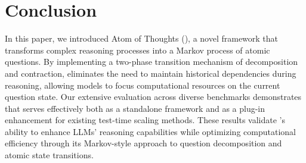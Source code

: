 \section{Conclusion}
In this paper, we introduced Atom of Thoughts (\our), a novel framework that transforms complex reasoning processes into a Markov process of atomic questions. By implementing a two-phase transition mechanism of decomposition and contraction, \our eliminates the need to maintain historical dependencies during reasoning, allowing models to focus computational resources on the current question state. Our extensive evaluation across diverse benchmarks demonstrates that \our serves effectively both as a standalone framework and as a plug-in enhancement for existing test-time scaling methods. These results validate \our's ability to enhance LLMs' reasoning capabilities while optimizing computational efficiency through its Markov-style approach to question decomposition and atomic state transitions.